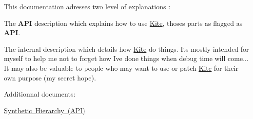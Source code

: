 This documentation adresses two level of explanations \+:


\begin{DoxyItemize}
\item The {\bfseries A\+PI} description which explains how to use \mbox{\hyperlink{namespaceKite}{Kite}}, thoses parts as flagged as {\bfseries A\+PI}. 
\item The internal description which details how \mbox{\hyperlink{namespaceKite}{Kite}} do things. It\textquotesingle{}s mostly intended for myself to help me not to forget how I\textquotesingle{}ve done things when debug time will come... It may also be valuable to people who may want to use or patch \mbox{\hyperlink{namespaceKite}{Kite}} for their own purpose (my secret hope). 
\end{DoxyItemize}

Additionnal documents\+:
\begin{DoxyItemize}
\item \mbox{\hyperlink{group__grpSynthHierarchy}{Synthetic Hierarchy (A\+PI)}} 
\end{DoxyItemize}